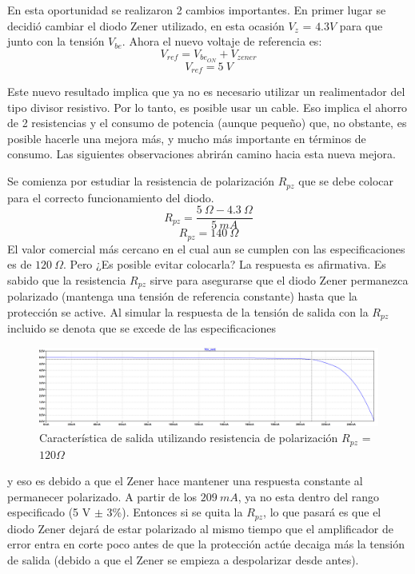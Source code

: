 En esta oportunidad se realizaron 2 cambios importantes. En primer lugar se decidió cambiar el diodo Zener utilizado, en esta ocasión $V_z$ = $4.3V$ para que junto con la tensión $V_{be}$.
Ahora el nuevo voltaje de referencia es:
\begin{equation}
	V_{ref} = V_{be_{ON}} + V_{zener}
\end{equation}
\begin{equation}
	V_{ref} = 5\ V
\end{equation}

Este nuevo resultado implica que ya no es necesario utilizar un realimentador del tipo divisor resistivo. Por lo tanto, es posible usar un cable. Eso implica el ahorro de 2 resistencias y el consumo de potencia (aunque pequeño) que, no obstante, es posible hacerle una mejora más, y mucho más importante en términos de consumo. Las siguientes observaciones abrirán camino hacia esta nueva mejora.

Se comienza por estudiar la resistencia de polarización $R_{pz}$ que se debe colocar para el correcto funcionamiento del diodo.
\begin{equation}
	R_{pz} = \frac{5 \ \Omega-4.3 \ \Omega}{5 \ mA}
\end{equation}
\begin{equation}
R_{pz} = 140 \ \Omega
\end{equation}
El valor comercial más cercano en el cual aun se cumplen con las especificaciones es de $120 \ \Omega$.
Pero ¿Es posible evitar colocarla? La respuesta es afirmativa.
Es sabido que la resistencia $R_{pz}$ sirve para asegurarse que el diodo Zener
permanezca polarizado (mantenga una tensión de referencia constante) hasta 
que la protección se active. Al simular la respuesta de la tensión de 
salida con la $R_{pz}$ incluido se denota que se excede de las especificaciones 
\begin{figure}[H]
	\centering
	\includegraphics[width=\linewidth]{ImagenesEjercicio1/ConRpz}
	\caption{Característica de salida utilizando resistencia de polarización $R_{pz}$ = $120\Omega$}
	\label{fig:conrpz}
\end{figure}
y eso es debido a que el Zener hace mantener una respuesta constante
al permanecer polarizado. A partir de los $209 \ mA$, ya no esta dentro del rango especificado
(5 V $\pm$ 3\%). Entonces si se quita la $R_{pz}$, lo que pasará es que el diodo Zener dejará de estar polarizado al mismo tiempo que el amplificador de error entra en corte poco antes de que la protección actúe
decaiga más la tensión de salida (debido a que el Zener se empieza a despolarizar desde antes).

